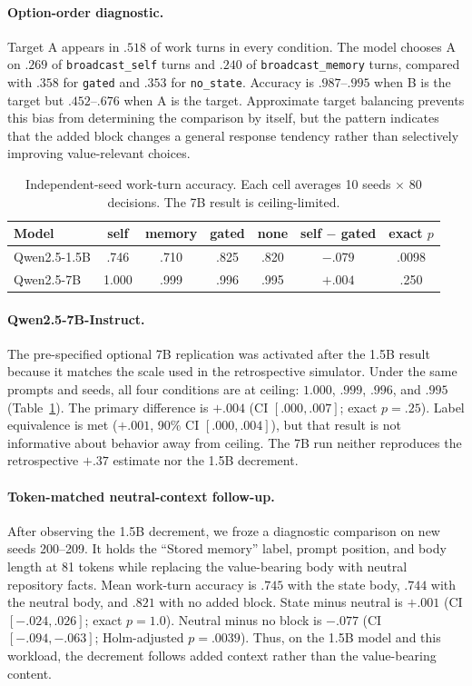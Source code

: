 \documentclass{article}
\begin{document}
\paragraph{Option-order diagnostic.} Target A appears in $.518$ of work turns in every condition. The model chooses A on $.269$ of \texttt{broadcast\_self} turns and $.240$ of \texttt{broadcast\_memory} turns, compared with $.358$ for \texttt{gated} and $.353$ for \texttt{no\_state}. Accuracy is $.987$--$.995$ when B is the target but $.452$--$.676$ when A is the target. Approximate target balancing prevents this bias from determining the comparison by itself, but the pattern indicates that the added block changes a general response tendency rather than selectively improving value-relevant choices.

\begin{table}[t]
\centering\small
\begin{tabular}{lcccccc}
\toprule
\textbf{Model} & \textbf{self} & \textbf{memory} & \textbf{gated} & \textbf{none} & \textbf{self $-$ gated} & \textbf{exact $p$} \\
\midrule
Qwen2.5-1.5B & .746 & .710 & .825 & .820 & $-.079$ & .0098 \\
Qwen2.5-7B & 1.000 & .999 & .996 & .995 & $+.004$ & .250 \\
\bottomrule
\end{tabular}
\caption{Independent-seed work-turn accuracy. Each cell averages 10 seeds $\times$ 80 decisions. The 7B result is ceiling-limited.}
\label{tab:confirmatory}
\end{table}

\paragraph{Qwen2.5-7B-Instruct.} The pre-specified optional 7B replication was activated after the 1.5B result because it matches the scale used in the retrospective simulator. Under the same prompts and seeds, all four conditions are at ceiling: $1.000$, $.999$, $.996$, and $.995$ (Table~\ref{tab:confirmatory}). The primary difference is $+.004$ (CI $[.000,.007]$; exact $p=.25$). Label equivalence is met ($+.001$, 90\% CI $[.000,.004]$), but that result is not informative about behavior away from ceiling. The 7B run neither reproduces the retrospective $+.37$ estimate nor the 1.5B decrement.

\paragraph{Token-matched neutral-context follow-up.} After observing the 1.5B decrement, we froze a diagnostic comparison on new seeds 200--209. It holds the ``Stored memory'' label, prompt position, and body length at 81 tokens while replacing the value-bearing body with neutral repository facts. Mean work-turn accuracy is $.745$ with the state body, $.744$ with the neutral body, and $.821$ with no added block. State minus neutral is $+.001$ (CI $[-.024,.026]$; exact $p=1.0$). Neutral minus no block is $-.077$ (CI $[-.094,-.063]$; Holm-adjusted $p=.0039$). Thus, on the 1.5B model and this workload, the decrement follows added context rather than the value-bearing content.
\end{document}
